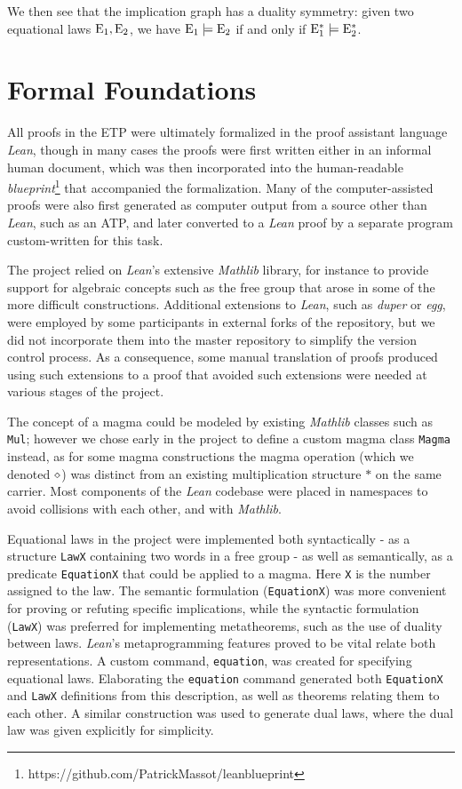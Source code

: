 We then see that the implication graph has a duality symmetry: given two equational laws $\mathrm{E}_1,\mathrm{E}_2$, we have $\mathrm{E}_1 \models \mathrm{E}_2$ if and only if $\mathrm{E}_1^* \models \mathrm{E}_2^*$.

\section{Formal Foundations}


All proofs in the ETP were ultimately formalized in the proof assistant language \emph{Lean}, though in many cases the proofs were first written either in an informal human document, which was then incorporated into the human-readable \emph{blueprint}\footnote{https://github.com/PatrickMassot/leanblueprint} that accompanied the formalization.  Many of the computer-assisted proofs were also first generated as computer output from a source other than \emph{Lean}, such as an ATP, and later converted to a \emph{Lean} proof by a separate program custom-written for this task.

The project relied on \emph{Lean}'s extensive \emph{Mathlib} library, for instance to provide support for algebraic concepts such as the free group that arose in some of the more difficult constructions.  Additional extensions to \emph{Lean}, such as \emph{duper} or \emph{egg}, were employed by some participants in external forks of the repository, but we did not incorporate them into the master repository to simplify the version control process.  As a consequence, some manual translation of proofs produced using such extensions to a proof that avoided such extensions were needed at various stages of the project.

The concept of a magma could be modeled by existing \emph{Mathlib} classes such as \texttt{Mul}; however we chose early in the project to define a custom magma class \texttt{Magma} instead, as for some magma constructions the magma operation (which we denoted $\diamond$) was distinct from an existing multiplication structure $*$ on the same carrier.  Most components of the \emph{Lean} codebase were placed in namespaces to avoid collisions with each other, and with \emph{Mathlib}.

Equational laws in the project were implemented both syntactically - as a structure \texttt{LawX} containing two words in a free group - as well as semantically, as a predicate \texttt{EquationX} that could be applied to a magma. Here \texttt{X} is the number assigned to the law. The semantic formulation (\texttt{EquationX}) was more convenient for proving or refuting specific implications, while the syntactic formulation (\texttt{LawX}) was preferred for implementing metatheorems, such as the use of duality between laws. \emph{Lean}'s metaprogramming features proved to be vital relate both representations. A custom command, \texttt{equation}, was created for specifying equational laws. Elaborating the \texttt{equation} command generated both \texttt{EquationX} and \texttt{LawX} definitions from this description, as well as theorems relating them to each other. A similar construction was used to generate dual laws, where the dual law was given explicitly for simplicity.


